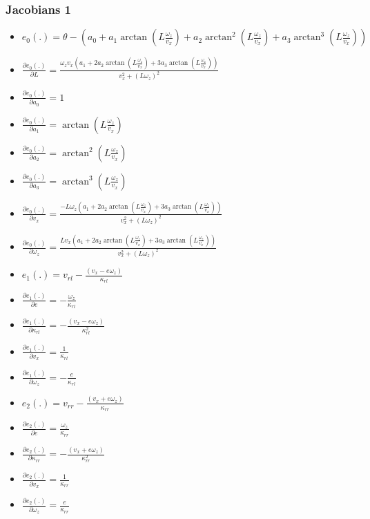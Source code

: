 \documentclass[12pt]{article}
\begin{document}
      \subsubsection{Jacobians 1}
        \begin{itemize}
          \item $e_0(.) = \theta - (a_0 + a_1\arctan(L\frac{\omega_z}{v_x}) +
            a_2\arctan^2(L\frac{\omega_z}{v_x}) +
            a_3\arctan^3(L\frac{\omega_z}{v_x}))$
          \item $\frac{\partial e_0(.)}{\partial L} =
            \frac{\omega_z v_x (a_1 + 2 a_2\arctan(L\frac{\omega_z}{v_x}) +
            3 a_3\arctan(L\frac{\omega_z}{v_x}))}{v_x^2 + (L\omega_z)^2}$
          \item $\frac{\partial e_0(.)}{\partial a_0} = 1$
          \item $\frac{\partial e_0(.)}{\partial a_1} =
            \arctan(L\frac{\omega_z}{v_x})$
          \item $\frac{\partial e_0(.)}{\partial a_2} =
            \arctan^2(L\frac{\omega_z}{v_x})$
          \item $\frac{\partial e_0(.)}{\partial a_3} =
            \arctan^3(L\frac{\omega_z}{v_x})$
          \item $\frac{\partial e_0(.)}{\partial v_x} =
            \frac{-L\omega_z(a_1 + 2 a_2\arctan(L\frac{\omega_z}{v_x}) +
            3 a_3\arctan(L\frac{\omega_z}{v_x}))}{v_x^2 + (L\omega_z)^2}$
          \item $\frac{\partial e_0(.)}{\partial \omega_z} =
            \frac{L v_x(a_1 + 2 a_2\arctan(L\frac{\omega_z}{v_x}) +
            3 a_3\arctan(L\frac{\omega_z}{v_x}))}{v_x^2 + (L\omega_z)^2}$

          \item $e_1(.) = v_{rl} - \frac{(v_x - e\omega_z)}{\kappa_{rl}}$
          \item $\frac{\partial e_1(.)}{\partial e} =
            -\frac{\omega_z}{\kappa_{rl}}$
          \item $\frac{\partial e_1(.)}{\partial \kappa_{rl}} =
            -\frac{(v_x - e\omega_z)}{\kappa_{rl}^2}$
          \item $\frac{\partial e_1(.)}{\partial v_x} = \frac{1}{\kappa_{rl}}$
          \item $\frac{\partial e_1(.)}{\partial \omega_z} =
            -\frac{e}{\kappa_{rl}}$

          \item $e_2(.) = v_{rr} - \frac{(v_x + e\omega_z)}{\kappa_{rr}}$
          \item $\frac{\partial e_2(.)}{\partial e} =
            \frac{\omega_z}{\kappa_{rr}}$
          \item $\frac{\partial e_2(.)}{\partial \kappa_{rr}} =
            -\frac{(v_x + e\omega_z)}{\kappa_{rr}^2}$
          \item $\frac{\partial e_2(.)}{\partial v_x} = \frac{1}{\kappa_{rr}}$
          \item $\frac{\partial e_2(.)}{\partial \omega_z} =
            \frac{e}{\kappa_{rr}}$


\end{itemize}
\end{document}
